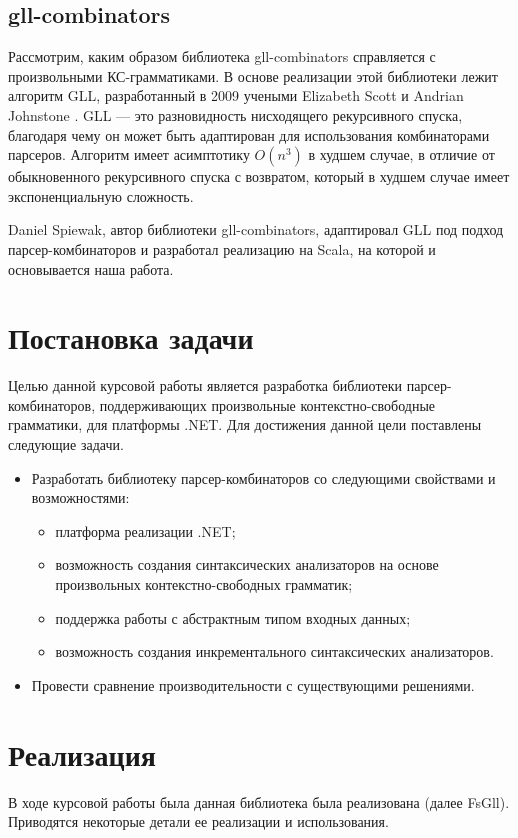\documentclass[14pt]{matmex-diploma}
\begin{document}
\subsection{gll-combinators}
Рассмотрим, каким образом библиотека gll-combinators справляется с произвольными КС-грамматиками.
В основе реализации этой библиотеки лежит алгоритм GLL, 
  разработанный в 2009 учеными Elizabeth Scott и Andrian Johnstone \cite{gllsj}. 
GLL --- это разновидность нисходящего рекурсивного спуска, 
  благодаря чему он может быть адаптирован для использования комбинаторами парсеров. 
Алгоритм имеет асимптотику  $O(n^3)$ в худшем случае, в отличие от обыкновенного 
  рекурсивного спуска с возвратом, который в худшем случае имеет экспоненциальную сложность.
  
Daniel Spiewak, автор библиотеки gll-combinators, адаптировал  GLL 
  под подход парсер-комбинаторов и разработал реализацию на Scala, на которой и основывается наша работа. 
  


\section{Постановка задачи}
Целью данной курсовой работы является разработка библиотеки парсер-комбинаторов,
поддерживающих произвольные контекстно-свободные грамматики, для платформы .NET.
Для достижения данной цели поставлены следующие задачи.
\begin{itemize}
    \item Разработать библиотеку парсер-комбинаторов со следующими свойствами и возможностями:
    \begin{itemize}
        \item платформа реализации .NET;
        \item возможность создания синтаксических анализаторов на основе произвольных контекстно-свободных грамматик;
        \item поддержка работы с абстрактным типом входных данных;
        \item возможность создания инкрементального синтаксических анализаторов.
    \end{itemize}
    \item Провести сравнение производительности с существующими решениями.
\end{itemize}


\section{Реализация}
В ходе курсовой работы была данная библиотека была реализована (далее FsGll). Приводятся некоторые детали ее реализации и использования.
\end{document}
